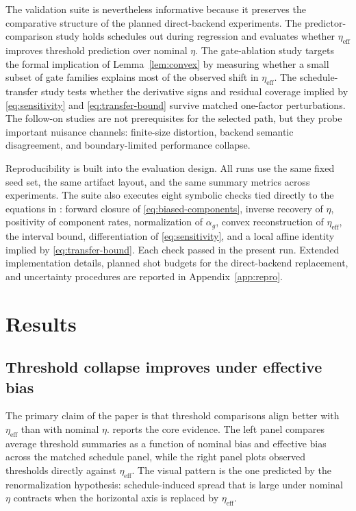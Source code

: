 \documentclass{article} %
\begin{document}
The validation suite is nevertheless informative because it preserves the comparative structure of the planned direct-backend experiments. The predictor-comparison study holds schedules out during regression and evaluates whether $\eta_{\mathrm{eff}}$ improves threshold prediction over nominal $\eta$. The gate-ablation study targets the formal implication of Lemma~\ref{lem:convex} by measuring whether a small subset of gate families explains most of the observed shift in $\eta_{\mathrm{eff}}$. The schedule-transfer study tests whether the derivative signs and residual coverage implied by \eqref{eq:sensitivity} and \eqref{eq:transfer-bound} survive matched one-factor perturbations. The follow-on studies are not prerequisites for the selected path, but they probe important nuisance channels: finite-size distortion, backend semantic disagreement, and boundary-limited performance collapse.

Reproducibility is built into the evaluation design. All runs use the same fixed seed set, the same artifact layout, and the same summary metrics across experiments. The suite also executes eight symbolic checks tied directly to the equations in : forward closure of \eqref{eq:biased-components}, inverse recovery of $\eta$, positivity of component rates, normalization of $\alpha_g$, convex reconstruction of $\eta_{\mathrm{eff}}$, the interval bound, differentiation of \eqref{eq:sensitivity}, and a local affine identity implied by \eqref{eq:transfer-bound}. Each check passed in the present run. Extended implementation details, planned shot budgets for the direct-backend replacement, and uncertainty procedures are reported in Appendix~\ref{app:repro}.

\section{Results}
\label{sec:results}

\subsection{Threshold collapse improves under effective bias}

The primary claim of the paper is that threshold comparisons align better with $\eta_{\mathrm{eff}}$ than with nominal $\eta$.  reports the core evidence. The left panel compares average threshold summaries as a function of nominal bias and effective bias across the matched schedule panel, while the right panel plots observed thresholds directly against $\eta_{\mathrm{eff}}$. The visual pattern is the one predicted by the renormalization hypothesis: schedule-induced spread that is large under nominal $\eta$ contracts when the horizontal axis is replaced by $\eta_{\mathrm{eff}}$.
\end{document}
